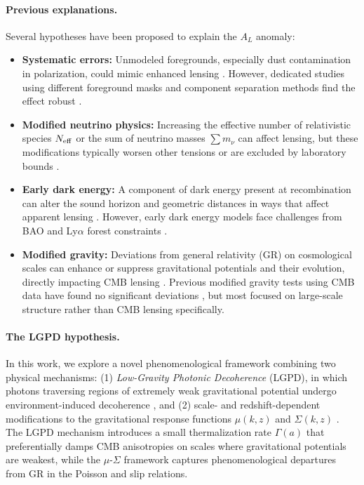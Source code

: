 \paragraph{Previous explanations.}
Several hypotheses have been proposed to explain the $A_L$ anomaly:
\begin{itemize}
\item \textbf{Systematic errors:} Unmodeled foregrounds, especially dust contamination in polarization, could mimic enhanced lensing \citep{Calabrese2017,Rosenberg2022}. However, dedicated studies using different foreground masks and component separation methods find the effect robust \citep{Planck2018_lensing}.
\item \textbf{Modified neutrino physics:} Increasing the effective number of relativistic species $N_{\rm eff}$ or the sum of neutrino masses $\sum m_\nu$ can affect lensing, but these modifications typically worsen other tensions or are excluded by laboratory bounds \citep{Archidiacono2020,Couchot2017}.
\item \textbf{Early dark energy:} A component of dark energy present at recombination can alter the sound horizon and geometric distances in ways that affect apparent lensing \citep{Poulin2019,Smith2020_EDE}. However, early dark energy models face challenges from BAO and Ly$\alpha$ forest constraints \citep{Hill2020,Ivanov2020}.
\item \textbf{Modified gravity:} Deviations from general relativity (GR) on cosmological scales can enhance or suppress gravitational potentials and their evolution, directly impacting CMB lensing \citep{Dossett2014,Zumalacarregui2017_hiclass,Bellini2014_effective}. Previous modified gravity tests using CMB data have found no significant deviations \citep{Planck2018_MG,Alam2021_BOSS}, but most focused on large-scale structure rather than CMB lensing specifically.
\end{itemize}

\paragraph{The LGPD hypothesis.}
In this work, we explore a novel phenomenological framework combining two physical mechanisms: (1) \emph{Low-Gravity Photonic Decoherence} (LGPD), in which photons traversing regions of extremely weak gravitational potential undergo environment-induced decoherence \citep{Bassi2013_models,Adler2007_gravdecoherence}, and (2) scale- and redshift-dependent modifications to the gravitational response functions $\mu(k,z)$ and $\Sigma(k,z)$ \citep{Pogosian2010_parameterizing,Silvestri2013_practical,Bellini2014_effective}. The LGPD mechanism introduces a small thermalization rate $\Gamma(a)$ that preferentially damps CMB anisotropies on scales where gravitational potentials are weakest, while the $\mu$-$\Sigma$ framework captures phenomenological departures from GR in the Poisson and slip relations.


